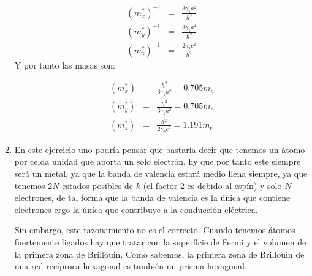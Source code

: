 \begin{solucion}
\begin{enumerate}[label=\alph*)]
		 \begin{eqnarray*}
		 	(m_{x}^*)^{-1} & = &  \frac{3\gamma_1 a^2}{\hbar^2}	 	\\
		 	(m_{y}^*)^{-1} & =  & \frac{3\gamma_1 a^2}{\hbar^2}   \\
		 	(m_{z}^*)^{-1} & = & \frac{2 \gamma_2 c^2}{\hbar^2}
		 \end{eqnarray*}	
		 Y por tanto las masas son: 
		 
		 \begin{eqnarray*}
		 	(m_{x}^*) & = & \frac{\hbar^2}{3\gamma_1 a^2}= 0.705 m_e	 	\\
		 	(m_{y}^*) & = & \frac{\hbar^2}{3\gamma_1 a^2}=0.705 m_e	  \\
		 	(m_{z}^*) & = & \frac{\hbar^2}{2 \gamma_2 c^2} = 1.191 m_e	 
		 \end{eqnarray*}	
		 \item En este ejercicio uno podría pensar que bastaría decir que tenemos un átomo por celda unidad que aporta un solo electrón, hy que por tanto este siempre será un metal, ya que la banda de valencia estará medio llena siempre, ya que tenemos $2N$ estados posibles de $k$ (el factor 2 es debido al espín) y solo $N$ electrones, de tal forma que la banda de valencia es la única que contiene electrones ergo la única que contribuye a la conducción eléctrica. 
		 
		 Sin embargo, este razonamiento no es el correcto. Cuando tenemos átomos fuertemente ligados hay que tratar con la superficie de Fermi y el volumen de la primera zona de Brillouin. Como sabemos, la primera zona de Brillouin de una red recíproca hexagonal es también un prisma hexagonal.
		 
		 
	\end{enumerate}
\end{solucion}

